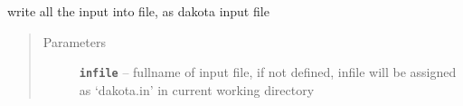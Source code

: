\documentclass[letterpaper,10pt,english]{sphinxmanual}
\begin{document}
\begin{fulllineitems}

\begin{fulllineitems}
\label{src/apidocs/dakutils:genopt.dakutils.DakotaInput.write}
write all the input into file, as dakota input file
\begin{quote}\begin{description}
\item[{Parameters}] \leavevmode
\textbf{\texttt{infile}} -- fullname of input file, if not defined, infile will
be assigned as `dakota.in' in current working directory

\end{description}\end{quote}

\end{fulllineitems}


\end{fulllineitems}

\end{document}
